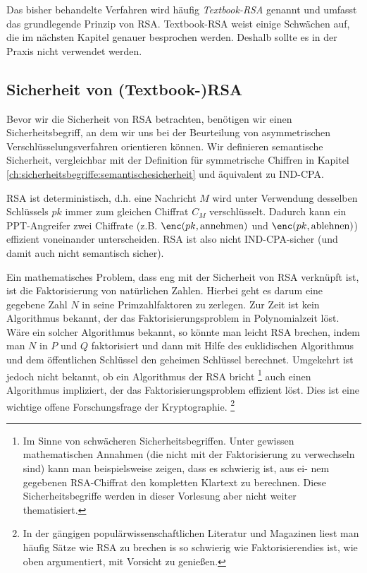 Das bisher behandelte Verfahren wird häufig \textit{Textbook-RSA} genannt und
umfasst das grundlegende Prinzip von RSA. Textbook-RSA weist einige
Schwächen auf, die im nächsten Kapitel genauer besprochen
werden. Deshalb sollte es in der Praxis nicht verwendet werden.

\subsection{Sicherheit von (Textbook-)RSA}
\label{ch:asymmenc:rsa:sicherheit}
Bevor wir die Sicherheit von RSA betrachten, benötigen wir einen Sicherheitsbegriff, an dem wir uns bei der Beurteilung von asymmetrischen
Verschlüsselungsverfahren orientieren können. Wir definieren semantische
Sicherheit, vergleichbar mit der Definition für symmetrische Chiffren in
Kapitel \ref{ch:sicherheitsbegriffe:semantischesicherheit} und
äquivalent zu IND-CPA. 

RSA ist deterministisch, d.h. eine Nachricht $M$ wird unter Verwendung
desselben Schlüssels $pk$ immer zum gleichen Chiffrat $C_M$
verschlüsselt. Dadurch kann ein PPT-Angreifer zwei Chiffrate (z.B. $\enc(pk, \text{annehmen})$ und $\enc(pk,
\text{ablehnen})$) effizient voneinander
unterscheiden. RSA ist also nicht IND-CPA-sicher (und damit auch
nicht semantisch sicher). 

Ein mathematisches Problem, dass eng mit der Sicherheit von RSA
verknüpft ist, ist die Faktorisierung von natürlichen Zahlen. Hierbei
geht es darum eine gegebene Zahl $N$ in seine Primzahlfaktoren zu
zerlegen. Zur Zeit ist kein Algorithmus bekannt, der das
Faktorisierungsproblem in Polynomialzeit löst. Wäre ein solcher
Algorithmus bekannt, so könnte man leicht RSA \glqq brechen\grqq , indem
man $N$ in $P$ und $Q$ faktorisiert und dann mit Hilfe des euklidischen
Algorithmus und dem öffentlichen Schlüssel den geheimen Schlüssel
berechnet. Umgekehrt ist jedoch nicht bekannt, ob ein Algorithmus der
RSA bricht \footnote{Im Sinne von schwächeren
Sicherheitsbegriffen. Unter gewissen mathematischen Annahmen (die nicht
mit der Faktorisierung zu verwechseln sind) kann man beispielsweise
zeigen, dass es schwierig ist, aus ei- nem gegebenen RSA-Chiffrat den
kompletten Klartext zu berechnen. Diese Sicherheitsbegriffe werden in
dieser Vorlesung aber nicht weiter thematisiert.} auch einen Algorithmus
impliziert, der das Faktorisierungsproblem effizient löst. Dies ist eine
wichtige offene Forschungsfrage der Kryptographie. \footnote{In der
gängigen populärwissenschaftlichen Literatur und Magazinen liest man
häufig Sätze wie \glqq RSA zu brechen is so schwierig wie
Faktorisieren\grqq dies ist, wie oben argumentiert, mit Vorsicht zu
genießen.}

